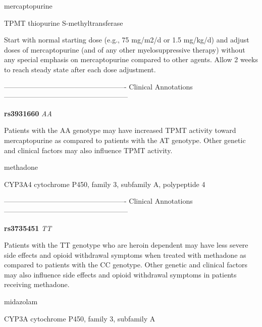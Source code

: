 \documentclass{resume} %
\begin{document}
\begin{rSection}{ mercaptopurine }
\begin{rSubsection}{ TPMT }{ thiopurine S-methyltransferase }{}{}
\item[] Start with normal starting dose (e.g., 75 mg/m2/d or 1.5 mg/kg/d) and adjust doses of mercaptopurine (and of any other myelosuppressive therapy) without any special emphasis on mercaptopurine compared to other agents. Allow 2 weeks to reach steady state after each dose adjustment.
\item[] ---------------------------------------------------- Clinical Annotations -----------------------------------------------------\newline
\item \textbf{ rs3931660 } \textit{ AA }
\item[] Patients with the AA genotype may have increased TPMT activity toward mercaptopurine as compared to patients with the AT genotype. Other genetic and clinical factors may also influence TPMT activity. 
\end{rSubsection}

\end{rSection}\begin{rSection}{ methadone }
\item[]

\begin{rSubsection}{ CYP3A4 }{ cytochrome P450, family 3, subfamily A, polypeptide 4 }{}{}
\item[]

\item[] ---------------------------------------------------- Clinical Annotations -----------------------------------------------------\newline
\item \textbf{ rs3735451 } \textit{ TT }
\item[] Patients with the TT genotype who are heroin dependent may have less severe side effects and opioid withdrawal symptoms when treated with methadone as compared to patients with the CC genotype. Other genetic and clinical factors may also influence side effects and opioid withdrawal symptoms in patients receiving methadone.
\end{rSubsection}

\end{rSection}\begin{rSection}{ midazolam }
\item[]

\begin{rSubsection}{ CYP3A }{ cytochrome P450, family 3, subfamily A }{}{}
\item[]


\end{rSubsection}
\end{rSection}
\end{document}
